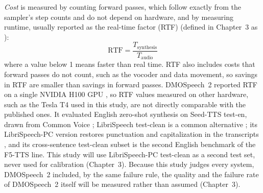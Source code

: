 \emph{Cost} is measured by counting forward passes, which follow exactly from the sampler's step counts and do not depend on hardware, and by measuring runtime, usually reported as the real-time factor (RTF) \parencite{li2025dmospeech2} (defined in Chapter~3 as ):
\begin{equation}
\mathrm{RTF} = \frac{T_{\text{synthesis}}}{T_{\text{audio}}}
\label{eq:rrl-rtf}
\end{equation}
where a value below 1 means faster than real time. RTF also includes costs that forward passes do not count, such as the vocoder and data movement, so savings in RTF are smaller than savings in forward passes. DMOSpeech~2 reported RTF on a single NVIDIA H100 GPU \parencite[p.~31819]{li2025dmospeech2}, so RTF values measured on other hardware, such as the Tesla T4 used in this study, are not directly comparable with the published ones. It evaluated English zero-shot synthesis on Seed-TTS test-en, drawn from Common Voice \parencites{anastassiou2024seedtts}{ardila2020commonvoice}[p.~31818]{li2025dmospeech2}; LibriSpeech test-clean is a common alternative \parencite{panayotov2015librispeech}; its LibriSpeech-PC version restores punctuation and capitalization in the transcripts \parencite{meister2023librispeechpc}, and its cross-sentence test-clean subset is the second English benchmark of the F5-TTS line. This study will use LibriSpeech-PC test-clean as a second test set, never used for calibration (Chapter~3). Because this study judges every system, DMOSpeech~2 included, by the same failure rule, the quality and the failure rate of DMOSpeech~2 itself will be measured rather than assumed (Chapter~3).

